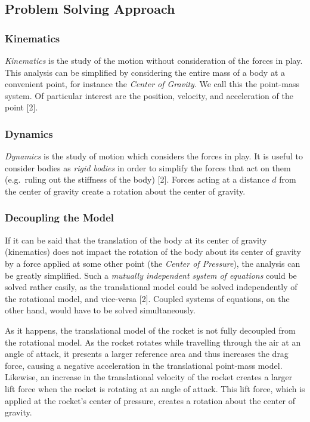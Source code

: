 \documentclass[]{article}
\begin{document}
\subsection{Problem Solving Approach}\label{problem-solving-approach}

\subsubsection{Kinematics}\label{kinematics}

\emph{Kinematics} is the study of the motion without consideration of
the forces in play. This analysis can be simplified by considering the
entire mass of a body at a convenient point, for instance the
\emph{Center of Gravity}. We call this the point-mass system. Of
particular interest are the position, velocity, and acceleration of the
point {[}2{]}.

\subsubsection{Dynamics}\label{dynamics}

\emph{Dynamics} is the study of motion which considers the forces in
play. It is useful to consider bodies as \emph{rigid bodies} in order to
simplify the forces that act on them (e.g.~ruling out the stiffness of
the body) {[}2{]}. Forces acting at a distance \(d\) from the center of
gravity create a rotation about the center of gravity.

\subsubsection{Decoupling the Model}\label{decoupling-the-model}

If it can be said that the translation of the body at its center of
gravity (kinematics) does not impact the rotation of the body about its
center of gravity by a force applied at some other point (the
\emph{Center of Pressure}), the analysis can be greatly simplified. Such
a \emph{mutually independent system of equations} could be solved rather
easily, as the translational model could be solved independently of the
rotational model, and vice-versa {[}2{]}. Coupled systems of equations,
on the other hand, would have to be solved simultaneously.

As it happens, the translational model of the rocket is not fully
decoupled from the rotational model. As the rocket rotates while
travelling through the air at an angle of attack, it presents a larger
reference area and thus increases the drag force, causing a negative
acceleration in the translational point-mass model. Likewise, an
increase in the translational velocity of the rocket creates a larger
lift force when the rocket is rotating at an angle of attack. This lift
force, which is applied at the rocket's center of pressure, creates a
rotation about the center of gravity.
\end{document}
